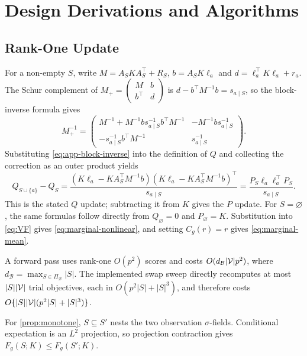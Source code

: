 \section{Design Derivations and Algorithms}
\label{sec:app-design}

\subsection{Rank-One Update}

For a non-empty $S$, write
$M=A_SKA_S^\top+R_S$, $b=A_SK\ell_a$ and
$d=\ell_a^\top K\ell_a+r_a$. The Schur complement of
$M_+=\left(\begin{smallmatrix}M&b\\b^\top&d\end{smallmatrix}\right)$ is
$d-b^\top M^{-1}b=s_{a\mid S}$, so the block-inverse formula
\citep[\S0.8]{horn2013matrix} gives
\begin{equation}
M_+^{-1}=
\begin{pmatrix}
M^{-1}+M^{-1}bs_{a\mid S}^{-1}b^\top M^{-1}
&-M^{-1}bs_{a\mid S}^{-1}\\
-s_{a\mid S}^{-1}b^\top M^{-1}&s_{a\mid S}^{-1}
\end{pmatrix}.
\label{eq:app-block-inverse}
\end{equation}
Substituting \eqref{eq:app-block-inverse} into the definition of $Q$ and
collecting the correction as an outer product yields
\begin{equation*}
Q_{S\cup\{a\}}-Q_S
=\frac{(K\ell_a-KA_S^\top M^{-1}b)
       (K\ell_a-KA_S^\top M^{-1}b)^\top}{s_{a\mid S}}
=\frac{P_S\ell_a\ell_a^\top P_S}{s_{a\mid S}}.
\end{equation*}
This is the stated $Q$ update; subtracting it from $K$ gives the $P$ update.
For $S=\varnothing$, the same formulas follow directly from
$Q_\varnothing=0$ and $P_\varnothing=K$. Substitution into \eqref{eq:VF}
gives \eqref{eq:marginal-nonlinear}, and setting $C_g(r)=r$ gives
\eqref{eq:marginal-mean}.

A forward pass uses rank-one $O(p^2)$ scores and costs
$O(d_{\mathcal B}|\mathcal{V}|p^2)$, where
$d_{\mathcal B}=\max_{S\in\Pi_{\mathcal B}}|S|$. The implemented
swap sweep directly recomputes at most $|S||\mathcal{V}|$ trial objectives, each in
$O(p^2|S|+|S|^3)$, and therefore costs
$O\{|S||\mathcal{V}|(p^2|S|+|S|^3)\}$.

For \cref{prop:monotone}, $S\subseteq S'$ nests the two observation
$\sigma$-fields. Conditional expectation is an $L^2$ projection, so projection
contraction gives $F_g(S;K)\le F_g(S';K)$.

